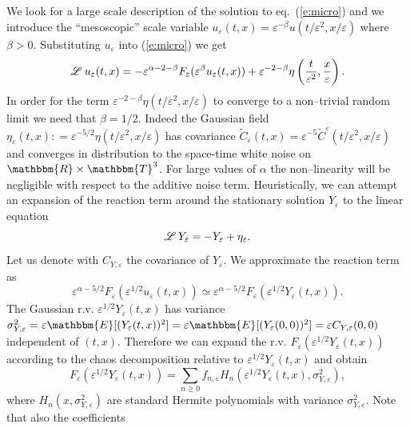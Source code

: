 \documentclass[a4paper,11pt]{article}
\newcommand{\LL}{\mathscr{L} \hspace{.2em}}
\begin{document}
We look for a large scale description of the solution to eq.~(\ref{e:micro})
and we introduce the ``mesoscopic'' scale variable $u_{\varepsilon} (t, x) =
\varepsilon^{- \beta} u (t / \varepsilon^2, x / \varepsilon)$ where $\beta >
0$. Substituting $u_{\varepsilon}$ into (\ref{e:micro}) we get
\begin{equation}
  \LL u_{\varepsilon} (t, x) = - \varepsilon^{\alpha - 2 - \beta}
  F_{\varepsilon} (\varepsilon^{\beta} u_{\varepsilon} (t, x)) +
  \varepsilon^{- 2 - \beta} \eta \left( \frac{t}{\varepsilon^2},
  \frac{x}{\varepsilon} \right) . \label{e:micro-2}
\end{equation}
In order for the term $\varepsilon^{- 2 - \beta} \eta (t / \varepsilon^2, x /
\varepsilon)$ to converge to a non--trivial random limit we need that $\beta =
1 / 2$. Indeed the Gaussian field $\eta_{\varepsilon} (t, x) : =
\varepsilon^{- 5 / 2} \eta (t / \varepsilon^2, x / \varepsilon)$ has
covariance $\tilde{C}_{\varepsilon} (t, x) = \varepsilon^{- 5}
\tilde{C}^{\varepsilon} (t / \varepsilon^2, x / \varepsilon)$ and converges in
distribution to the space-time white noise on $\mathbbm{R} \times
\mathbbm{T}^3$. For large values of $\alpha$ the non--linearity will be
negligible with respect to the additive noise term. Heuristically, we can
attempt an expansion of the reaction term around the stationary solution
$Y_{\varepsilon}$ to the linear equation
\[ \LL Y_{\varepsilon} = - Y_{\varepsilon} + \eta_{\varepsilon} . \]
Let us denote with $C_{Y, \varepsilon}$ the covariance of $Y_{\varepsilon}$.
We approximate the reaction term as
\[ \varepsilon^{\alpha - 5 / 2} F_{\varepsilon} (\varepsilon^{1 / 2}
   u_{\varepsilon} (t, x)) \simeq \varepsilon^{\alpha - 5 / 2} F_{\varepsilon}
   (\varepsilon^{1 / 2} Y_{\varepsilon} (t, x)) . \]
The Gaussian r.v. $\varepsilon^{1 / 2} Y_{\varepsilon} (t, x)$ has variance
$\sigma^2_{Y, \varepsilon} = \varepsilon \mathbbm{E} [ (Y_{\varepsilon} (t,
x))^2] = \varepsilon \mathbbm{E} [ (Y_{\varepsilon} (0, 0))^2] = \varepsilon
C_{Y, \varepsilon} (0, 0)$ independent of $(t, x)$. Therefore we can expand
the r.v. $F_{\varepsilon} (\varepsilon^{1 / 2} Y_{\varepsilon} (t, x))$
according to the chaos decomposition relative to $\varepsilon^{1 / 2}
Y_{\varepsilon} (t, x)$ and obtain
\[ F_{\varepsilon} (\varepsilon^{1 / 2} Y_{\varepsilon} (t, x)) = \sum_{n
   \geqslant 0} f_{n, \varepsilon} H_n (\varepsilon^{1 / 2} Y_{\varepsilon}
   (t, x), \sigma^2_{Y, \varepsilon}), \]
where $H_n (x, \sigma^2_{Y, \varepsilon})$ are standard Hermite polynomials
with variance $\sigma^2_{Y, \varepsilon}$. Note that also the coefficients
\end{document}

